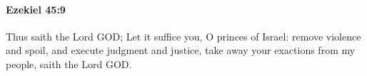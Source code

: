 
		\paragraph{Ezekiel 45:9} %
			\label{EZEKIEL-45-9}

			Thus saith the Lord GOD; Let it suffice you, O princes of Israel: remove violence and spoil, and execute judgment and justice, take away your exactions from my people, saith the Lord GOD.


